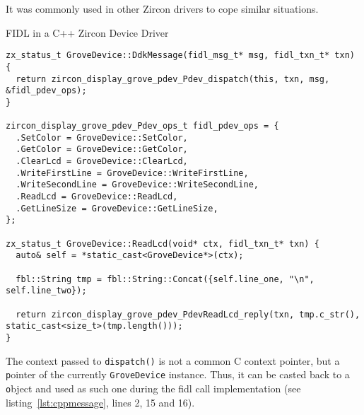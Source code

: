 It was commonly used in other Zircon drivers to cope similar situations.
%
%
%
\begin{listing} [H]
\caption{FIDL in a C++ Zircon Device Driver}
\label{lst:cppmessage}
\begin{verbatim}
zx_status_t GroveDevice::DdkMessage(fidl_msg_t* msg, fidl_txn_t* txn) {
  return zircon_display_grove_pdev_Pdev_dispatch(this, txn, msg, &fidl_pdev_ops);
}

zircon_display_grove_pdev_Pdev_ops_t fidl_pdev_ops = {
  .SetColor = GroveDevice::SetColor,
  .GetColor = GroveDevice::GetColor,
  .ClearLcd = GroveDevice::ClearLcd,
  .WriteFirstLine = GroveDevice::WriteFirstLine,
  .WriteSecondLine = GroveDevice::WriteSecondLine,
  .ReadLcd = GroveDevice::ReadLcd,
  .GetLineSize = GroveDevice::GetLineSize,
};

zx_status_t GroveDevice::ReadLcd(void* ctx, fidl_txn_t* txn) {
  auto& self = *static_cast<GroveDevice*>(ctx);

  fbl::String tmp = fbl::String::Concat({self.line_one, "\n", self.line_two});

  return zircon_display_grove_pdev_PdevReadLcd_reply(txn, tmp.c_str(), static_cast<size_t>(tmp.length()));
}
\end{verbatim}
\end{listing}
%
The context passed to \texttt{dispatch()} is not a common C context pointer, but a \texttt pointer of the currently \texttt{GroveDevice} instance.
Thus, it can be casted back to a \texttt object and used as such one during the \ac{fidl} call implementation (see listing~\ref{lst:cppmessage}, lines 2, 15 and 16).

